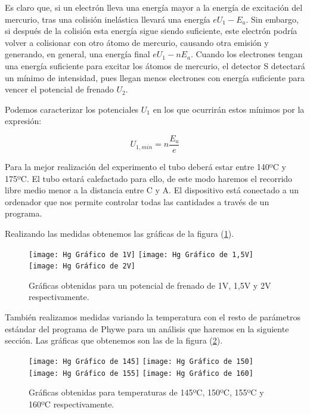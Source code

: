 \documentclass{article}
\begin{document}
Es claro que, si un electrón lleva una energía mayor a la energía de excitación del mercurio, tras una colisión inelástica llevará una energía $eU_1 - E_a$. Sin embargo, si después de la colisión esta energía sigue siendo suficiente, este electrón podría volver a colisionar con otro átomo de mercurio, causando otra emisión y generando, en general, una energía final $eU_1 - nE_a$. Cuando los electrones tengan una energía suficiente para excitar los átomos de mercurio, el detector S detectará un mínimo de intensidad, pues llegan menos electrones con energía suficiente para vencer el potencial de frenado $U_2$.

Podemos caracterizar los potenciales $U_1$ en los que ocurrirán estos mínimos por la expresión:

\begin{equation}
U_{1, min} = n \frac{E_a}{e}
\label{eq:Ea}
\end{equation}

Para la mejor realización del experimento el tubo deberá estar entre 140ºC y 175ºC. El tubo estará calefactado para ello, de este modo haremos el recorrido libre medio menor a la distancia entre C y A. El dispositivo está conectado a un ordenador que nos permite controlar todas las cantidades a través de un programa.

Realizando las medidas obtenemos las gráficas de la figura (\ref{fig:medHg}).

\begin{figure}[h!]
\begin{center}
\texttt{[image: Hg Gráfico de 1V]}
\texttt{[image: Hg Gráfico de 1,5V]}
\texttt{[image: Hg Gráfico de 2V]}
\caption{Gráficas obtenidas para un potencial de frenado de 1V, 1,5V y 2V respectivamente.}
\label{fig:medHg}
\end{center}
\end{figure}

También realizamos medidas variando la temperatura con el resto de parámetros estándar del programa de Phywe para un análisis que haremos en la siguiente sección. Las gráficas que obtenemos son las de la figura (\ref{fig:tempsHg}).

\begin{figure}[h!]
\begin{center}
\texttt{[image: Hg Gráfico de 145]}
\texttt{[image: Hg Gráfico de 150]}
\texttt{[image: Hg Gráfico de 155]}
\texttt{[image: Hg Gráfico de 160]}
\caption{Gráficas obtenidas para temperaturas de 145ºC, 150ºC, 155ºC y 160ºC respectivamente.}
\label{fig:tempsHg}
\end{center}
\end{figure}
\end{document}

